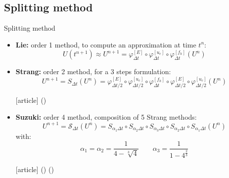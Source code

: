 \documentclass{beamer}
\newcommand{\mbold}[1]{{\textbf{\color{PLB}#1}}}
\newcommand{\customcite}[1]{\citeauthor{#1} (\citeyear{#1})}
\begin{document}
\subsection{Splitting method}
\begin{frame}{Splitting method}
  \begin{itemize}
    \item \mbold{Lie:} order 1 method, to compute an approximation at time $t^n$: $$U(t^{n+1})\approx U^{n+1} = \varphi^{[E]}_{\Delta t} \circ \varphi^{[u_c]}_{\Delta t} \circ \varphi^{[f_h]}_{\Delta t}(U^n)$$
    \item \mbold{Strang:} order 2 method, for a 3 steps formulation: $$U^{n+1} = S_{\Delta t}(U^n) = \varphi^{[E]}_{\Delta t/2} \circ \varphi^{[u_c]}_{\Delta t/2} \circ \varphi^{[f_h]}_{\Delta t} \circ \varphi^{[E]}_{\Delta t/2} \circ \varphi^{[u_c]}_{\Delta t/2} (U^n) $$ \begin{thebibliography}{9}
    [article]
     \customcite{Strang:1968}
  \end{thebibliography}
    \item \mbold{Suzuki:} order 4 method, composition of 5 Strang methods: $$
      U^{n+1} = \mathcal{S}_{\Delta t}(U^n) = S_{\alpha_1\Delta t} \circ S_{\alpha_2\Delta t} \circ S_{\alpha_3\Delta t} \circ S_{\alpha_2\Delta t} \circ S_{\alpha_1\Delta t} (U^n)
    $$with: $$ \alpha_1 = \alpha_2 = \frac{1}{4 - \sqrt[3]{4}} \qquad \alpha_3 = \frac{1}{1- 4^{\frac{2}{3}}}$$ \begin{thebibliography}{9}
    [article]
     \customcite{Suzuki:1990}
     \customcite{Casas:2020}
  \end{thebibliography}
  \end{itemize}
\end{frame}
\end{document}
